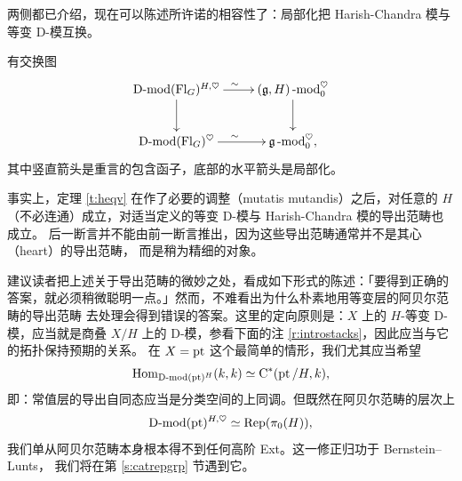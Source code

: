 \ssszh 两侧都已介绍，现在可以陈述所许诺的相容性了：局部化把 Harish-Chandra 模与
等变 D-模互换。

\begin{theo}\label{t:heqv}
有交换图
%
\[
\xymatrix{\Dmod(\sB)^{H, \heartsuit} \ar[r]^\sim \ar[d] & (\fg,
H)\mod_0^\heartsuit \ar[d]  \\  \Dmod(\sB)^\heartsuit \ar[r]^\sim &
\fg\mod_0^\heartsuit,}
\]
%
其中竖直箭头是重言的包含函子，底部的水平箭头是局部化。
\end{theo}

\ssszh 事实上，定理 \ref{t:heqv} 在作了必要的调整（mutatis mutandis）之后，对任意的
$H$（不必连通）成立，对适当定义的等变 D-模与 Harish-Chandra 模的导出范畴也成立。
后一断言并不能由前一断言推出，因为这些导出范畴通常并不是其心（heart）的导出范畴，
而是稍为精细的对象。

\begin{re} 建议读者把上述关于导出范畴的微妙之处，看成如下形式的陈述：「要得到正确的答案，就必须稍微聪明一点。」然而，不难看出为什么朴素地用等变层的阿贝尔范畴的导出范畴
去处理会得到错误的答案。这里的定向原则是：$X$ 上的 $H$-等变 D-模，应当就是商叠
$X/H$ 上的 D-模，参看下面的注 \ref{r:introstacks}，因此应当与它的拓扑保持预期的关系。
在 $X = \operatorname{pt}$ 这个最简单的情形，我们尤其应当希望
%
\[
\operatorname{Hom}_{\operatorname{D-mod}(\operatorname{pt})^H}(k, k) \simeq \operatorname{C}^*(\operatorname{pt}/H, k),
\]
%
即：常值层的导出自同态应当是分类空间的上同调。但既然在阿贝尔范畴的层次上
%
\[
\operatorname{D-mod}(\operatorname{pt})^{H, \heartsuit} \simeq \operatorname{Rep}(\pi_0(H)),
\]
%
我们单从阿贝尔范畴本身根本得不到任何高阶 Ext。这一修正归功于 Bernstein--Lunts，
我们将在第 \ref{s:catrepgrp} 节遇到它。
\end{re}

